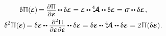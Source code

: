 \nopagebreak\vspace{-0.2em}
\begin{equation}\label{thefirstandsecondvariationsofpotentialenergydensity.linearelasticity}
\begin{gathered}
\variation{\hspace{.1ex}\potentialenergydensity}
( \hspace{-0.1ex}
    \infinitesimaldeformation
\hspace{-0.1ex} ) \hspace{-0.2ex}
= \scalebox{.9}{$
    \displaystyle\frac{
        \raisemath{-0.16em}
        {\partial \hspace{.1ex} \potentialenergydensity}}
        {\partial \infinitesimaldeformation}
    $} \hspace{-0.1ex}
\dotdotp
\variation{\infinitesimaldeformation}
= \infinitesimaldeformation
\hspace{-0.1ex} \dotdotp \hspace{-0.1ex}
\stiffnesstensor
\dotdotp
\variation{\infinitesimaldeformation}
= \linearstress
\dotdotp
\variation{\infinitesimaldeformation}
\hspace{.2ex} ,
\\
%
\secondvariation{\hspace{.1ex}\potentialenergydensity}(\hspace{-0.1ex}
\infinitesimaldeformation
\hspace{-0.1ex}) \hspace{-0.2ex}
= \variation{\infinitesimaldeformation}
\hspace{-0.1ex} \dotdotp
\scalebox{.9}{$ \displaystyle\frac{\raisemath{-0.16em}{\partial^2 \hspace{.1ex} \potentialenergydensity}}{ \partial \infinitesimaldeformation \hspace{.1ex} \partial \infinitesimaldeformation } $}
\hspace{-0.1ex} \dotdotp
\variation{\infinitesimaldeformation}
= \variation{\infinitesimaldeformation}
\hspace{-0.1ex} \dotdotp
\stiffnesstensor
\dotdotp
\variation{\infinitesimaldeformation}
= 2 \hspace{.25ex} \potentialenergydensity (\variation{\infinitesimaldeformation})
\hspace{.1ex} .
\end{gathered}
\end{equation}

\subsection*{}

